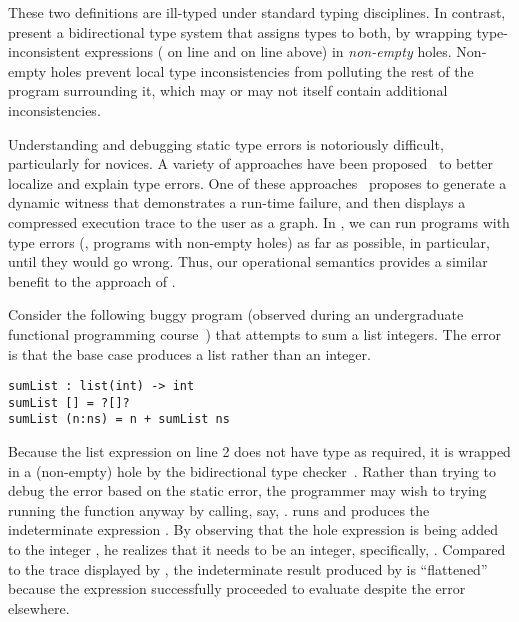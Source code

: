 \noindent
%
These two definitions are ill-typed under standard typing disciplines.
%
In contrast, \citet{popl-paper} present a bidirectional type system that assigns
types to both, by wrapping type-inconsistent expressions ( on line
 and  on line  above) in \emph{non-empty} holes.
%
Non-empty holes prevent local type inconsistencies from polluting the rest of
the program surrounding it, which may or may not itself contain additional
inconsistencies.

Understanding and debugging static type errors is notoriously difficult,
particularly for novices.
%
A variety of approaches have been
proposed~\cite{Seminal,ChenErwig2014,Pavlinovic2015,sherrloc} to better localize
and explain type errors.
%
One of these approaches~\cite{Seidel2016} proposes to generate a dynamic witness
that demonstrates a run-time failure, and then displays a compressed execution
trace to the user as a graph.
%
In \HazelnutLive{}, we can run programs with type errors (\ie{}, programs with
non-empty holes) as far as possible, in particular, until they
would go wrong.
%
Thus, our operational semantics provides a similar benefit to the approach of
\citet{Seidel2016}.

%
Consider the following buggy program (observed during an undergraduate
functional programming course~\cite{Seidel2016}) that attempts to sum a list
integers.
%
The error is that the base case produces a list rather than an integer.

\begin{lstlisting}
sumList : list(int) -> int
sumList [] = ?[]?
sumList (n:ns) = n + sumList ns
\end{lstlisting}

\noindent
%
Because the list expression on line 2 does not have type  as required,
it is wrapped in a (non-empty) hole by the bidirectional type
checker~\cite{popl-paper}.
%
Rather than trying to debug the error based on the static error, the programmer
may wish to trying running the function anyway by calling, say, .
%
\HazelnutLive{} runs and produces the indeterminate expression .
%
By observing that the hole expression is being added to the integer , he
realizes that it needs to be an integer, specifically, .
%
Compared to the trace displayed by \citet{Seidel2016}, the indeterminate result
produced by \HazelnutLive{} is ``flattened'' because the expression 
successfully proceeded to evaluate despite the error elsewhere.


